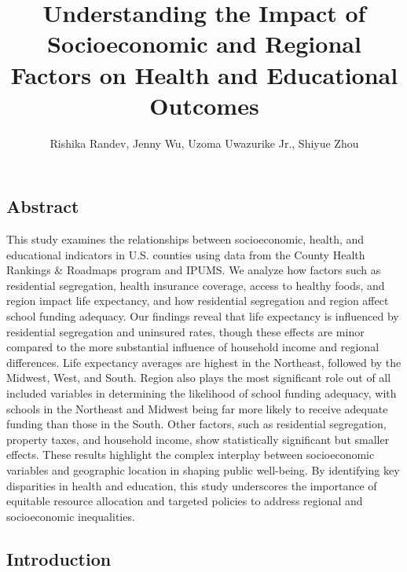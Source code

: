 \documentclass[
  10pt,
  letterpaper,
  DIV=11,
  numbers=noendperiod]{scrartcl}
\title{Understanding the Impact of Socioeconomic and Regional Factors on
Health and Educational Outcomes}
\author{Rishika Randev, Jenny Wu, Uzoma Uwazurike Jr., Shiyue Zhou}
\date{}
\begin{document}
\maketitle

\subsection{Abstract}\label{abstract}

This study examines the relationships between socioeconomic, health, and
educational indicators in U.S. counties using data from the County
Health Rankings \& Roadmaps program and IPUMS. We analyze how factors
such as residential segregation, health insurance coverage, access to
healthy foods, and region impact life expectancy, and how residential
segregation and region affect school funding adequacy. Our findings
reveal that life expectancy is influenced by residential segregation and
uninsured rates, though these effects are minor compared to the more
substantial influence of household income and regional differences. Life
expectancy averages are highest in the Northeast, followed by the
Midwest, West, and South. Region also plays the most significant role
out of all included variables in determining the likelihood of school
funding adequacy, with schools in the Northeast and Midwest being far
more likely to receive adequate funding than those in the South. Other
factors, such as residential segregation, property taxes, and household
income, show statistically significant but smaller effects. These
results highlight the complex interplay between socioeconomic variables
and geographic location in shaping public well-being. By identifying key
disparities in health and education, this study underscores the
importance of equitable resource allocation and targeted policies to
address regional and socioeconomic inequalities.

\subsection{\texorpdfstring{\textbf{Introduction}}{Introduction}}\label{introduction}
\end{document}
